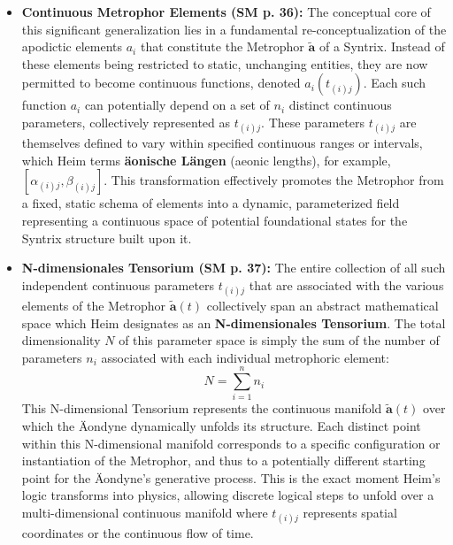 \documentclass[12pt]{article}
\newcommand{\metrophor}{\bm{\widetilde{a}}}
\begin{document}
\begin{itemize}
    \item \textbf{Continuous Metrophor Elements (SM p. 36):}
    The conceptual core of this significant generalization lies in a fundamental re-conceptualization of the apodictic elements \( a_i \) that constitute the Metrophor \( \metrophor \) of a Syntrix. Instead of these elements being restricted to static, unchanging entities, they are now permitted to become continuous functions, denoted \( a_i(t_{(i)j}) \). Each such function \( a_i \) can potentially depend on a set of \( n_i \) distinct continuous parameters, collectively represented as \( t_{(i)j} \). These parameters \( t_{(i)j} \) are themselves defined to vary within specified continuous ranges or intervals, which Heim terms \textbf{äonische Längen} (aeonic lengths), for example, \( [\alpha_{(i)j}, \beta_{(i)j}] \). This transformation effectively promotes the Metrophor from a fixed, static schema of elements into a dynamic, parameterized field representing a continuous space of potential foundational states for the Syntrix structure built upon it.

    \item \textbf{N-dimensionales Tensorium (SM p. 37):}
    The entire collection of all such independent continuous parameters \( t_{(i)j} \) that are associated with the various elements of the Metrophor \( \metrophor(t) \) collectively span an abstract mathematical space which Heim designates as an \textbf{N-dimensionales Tensorium}. The total dimensionality \( N \) of this parameter space is simply the sum of the number of parameters \(n_i\) associated with each individual metrophoric element: 
    \begin{equation*}
    N = \sum_{i=1}^n n_i
    \end{equation*}
    This N-dimensional Tensorium represents the continuous manifold \( \metrophor(t) \) over which the Äondyne dynamically unfolds its structure. Each distinct point within this N-dimensional manifold corresponds to a specific configuration or instantiation of the Metrophor, and thus to a potentially different starting point for the Äondyne's generative process. This is the exact moment Heim's logic transforms into physics, allowing discrete logical steps to unfold over a multi-dimensional continuous manifold where $t_{(i)j}$ represents spatial coordinates or the continuous flow of time.


\end{itemize}
\end{document}
